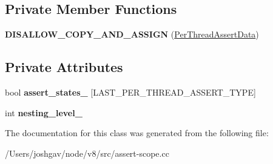 \subsection*{Private Member Functions}
\begin{DoxyCompactItemize}
\item 
{\bfseries D\+I\+S\+A\+L\+L\+O\+W\+\_\+\+C\+O\+P\+Y\+\_\+\+A\+N\+D\+\_\+\+A\+S\+S\+I\+GN} (\hyperlink{classv8_1_1internal_1_1_per_thread_assert_data}{Per\+Thread\+Assert\+Data})\hypertarget{classv8_1_1internal_1_1_per_thread_assert_data_ab284a23df1a3c390549a4a52c807bff8}{}\label{classv8_1_1internal_1_1_per_thread_assert_data_ab284a23df1a3c390549a4a52c807bff8}

\end{DoxyCompactItemize}
\subsection*{Private Attributes}
\begin{DoxyCompactItemize}
\item 
bool {\bfseries assert\+\_\+states\+\_\+} \mbox{[}L\+A\+S\+T\+\_\+\+P\+E\+R\+\_\+\+T\+H\+R\+E\+A\+D\+\_\+\+A\+S\+S\+E\+R\+T\+\_\+\+T\+Y\+PE\mbox{]}\hypertarget{classv8_1_1internal_1_1_per_thread_assert_data_a1fbdddf374a99c86c4e4ab444df415ba}{}\label{classv8_1_1internal_1_1_per_thread_assert_data_a1fbdddf374a99c86c4e4ab444df415ba}

\item 
int {\bfseries nesting\+\_\+level\+\_\+}\hypertarget{classv8_1_1internal_1_1_per_thread_assert_data_a84a1bb53368f85c3de4299c9b62ba062}{}\label{classv8_1_1internal_1_1_per_thread_assert_data_a84a1bb53368f85c3de4299c9b62ba062}

\end{DoxyCompactItemize}


The documentation for this class was generated from the following file\+:\begin{DoxyCompactItemize}
\item 
/\+Users/joshgav/node/v8/src/assert-\/scope.\+cc\end{DoxyCompactItemize}

